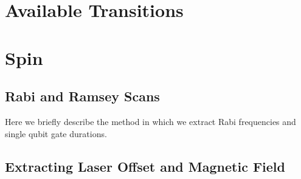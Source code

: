 \documentclass[12pt]{report}
\begin{document}
\section{Available Transitions}
\label{sec:Transitions}

\section{Spin}
\label{sec:Spin}

\subsection{Rabi and Ramsey Scans}
    Here we briefly describe the method in which we extract Rabi frequencies and single qubit gate durations.

\subsection{Extracting Laser Offset and Magnetic Field}
\end{document}
